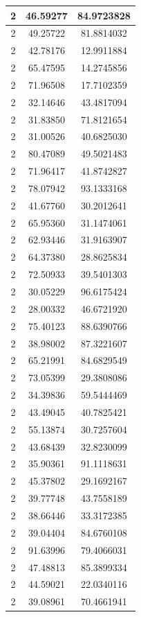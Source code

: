 \documentclass[
]{book}
\begin{document}
\begin{tabular}{c|c|c}
\hline
2 & 46.59277 & 84.9723828\\
\hline
2 & 49.25722 & 81.8814032\\
\hline
2 & 42.78176 & 12.9911884\\
\hline
2 & 65.47595 & 14.2745856\\
\hline
2 & 71.96508 & 17.7102359\\
\hline
2 & 32.14646 & 43.4817094\\
\hline
2 & 31.83850 & 71.8121654\\
\hline
2 & 31.00526 & 40.6825030\\
\hline
2 & 80.47089 & 49.5021483\\
\hline
2 & 71.96417 & 41.8742827\\
\hline
2 & 78.07942 & 93.1333168\\
\hline
2 & 41.67760 & 30.2012641\\
\hline
2 & 65.95360 & 31.1474061\\
\hline
2 & 62.93446 & 31.9163907\\
\hline
2 & 64.37380 & 28.8625834\\
\hline
2 & 72.50933 & 39.5401303\\
\hline
2 & 30.05229 & 96.6175424\\
\hline
2 & 28.00332 & 46.6721920\\
\hline
2 & 75.40123 & 88.6390766\\
\hline
2 & 38.98002 & 87.3221607\\
\hline
2 & 65.21991 & 84.6829549\\
\hline
2 & 73.05399 & 29.3808086\\
\hline
2 & 34.39836 & 59.5444469\\
\hline
2 & 43.49045 & 40.7825421\\
\hline
2 & 55.13874 & 30.7257604\\
\hline
2 & 43.68439 & 32.8230099\\
\hline
2 & 35.90361 & 91.1118631\\
\hline
2 & 45.37802 & 29.1692167\\
\hline
2 & 39.77748 & 43.7558189\\
\hline
2 & 38.66446 & 33.3172385\\
\hline
2 & 39.04404 & 84.6760108\\
\hline
2 & 91.63996 & 79.4066031\\
\hline
2 & 47.48813 & 85.3899334\\
\hline
2 & 44.59021 & 22.0340116\\
\hline
2 & 39.08961 & 70.4661941\\

\end{tabular}
\end{document}
